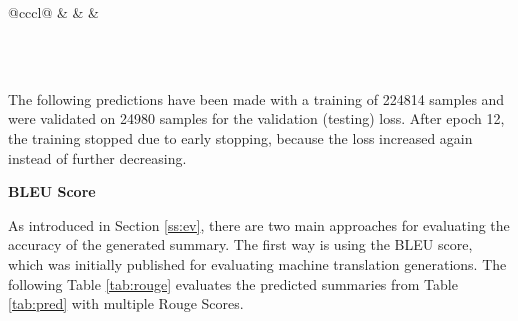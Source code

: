 \begin{table}[]
\begin{tabular}{@{}cccl@{}}
		 &                                                  &            &  \\ \bottomrule
	\end{tabular} \\ \\
	\caption{\label{tab:pred}This table shows some example outputs for the training data from my trained model} 
\end{table}

The following predictions have been made with a training of 224814 samples and were validated on 24980 samples for the validation (testing) loss. After epoch 12, the training stopped due to early stopping, because the loss increased again instead of further decreasing. 

\textbf{BLEU Score}

As introduced in Section \ref{ss:ev}, there are two main approaches for evaluating the accuracy of the generated summary. The first way is using the BLEU score, which was initially published for evaluating machine translation generations. The following Table \ref{tab:rouge} evaluates the predicted summaries from Table \ref{tab:pred} with multiple Rouge Scores.


